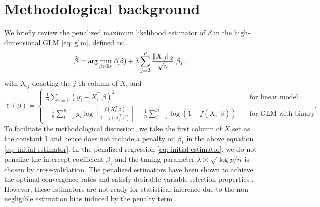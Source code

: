 \section{Methodological background}
\label{sec: MB}
We briefly review the penalized maximum likelihood estimator of $\beta$ in the high-dimensional GLM \eqref{eq: glm}, defined as:
\begin{equation}
    \widehat{\beta} = \arg\min_{\beta \in \mathbb{R}^p} \ell(\beta) + \lambda \sum_{j=2}^p \frac{\|X_{\cdot j}\|_2}{\sqrt{n}} |\beta_j|,
    \label{eq: initial estimator}
\end{equation}
with $X_{\cdot j}$ denoting the $j$-th column of $X$, and 
\begin{equation}
    \ell(\beta) = 
    \begin{cases}
        \frac{1}{n} \sum_{i=1} \left(y_i - X_{i\cdot}^{\intercal} \beta\right)^2 & \quad \textrm{for linear model}\\ 
        -\frac{1}{n} \sum_{i=1}^n y_i \log{\left[\frac{f(X_{i\cdot}^\intercal \beta)}{1 - f(X_{i\cdot}^\intercal \beta)} \right]} - \frac{1}{n} \sum_{i=1}^n \log{\left( 1 - f(X_{i\cdot}^\intercal \beta) \right)} & \quad \textrm{for GLM with binary outcome.}
    \end{cases}.
\end{equation}
To facilitate the methodological discussion, we take the first column of $X$ set as the constant 1 and hence does not include a penalty on $\beta_1$ in the above equation \eqref{eq: initial estimator}.
In the penalized regression \eqref{eq: initial estimator}, we do not penalize the intercept coefficient $\beta_1$ and the tuning parameter $\lambda \asymp \sqrt{\log p/n}$ is chosen by cross-validation. The penalized estimators have been shown to achieve the optimal convergence rates and satisfy desirable variable selection properties \citep{meinshausen2006high, bickel2009simultaneous, zhao2006model, wainwright2009sharp}. However, these estimators are not ready for statistical inference due to the non-negligible estimation bias induced by the penalty term \citep{van2014asymptotically, javanmard2014confidence, zhang2014confidence}. 

